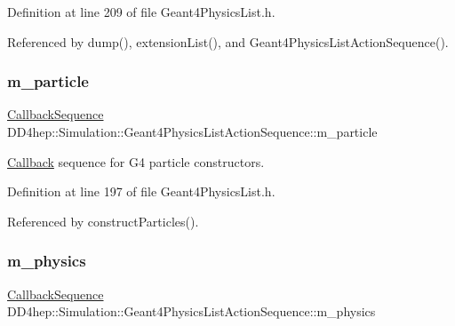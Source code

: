 Definition at line 209 of file Geant4\+Physics\+List.\+h.



Referenced by dump(), extension\+List(), and Geant4\+Physics\+List\+Action\+Sequence().

\hypertarget{class_d_d4hep_1_1_simulation_1_1_geant4_physics_list_action_sequence_ab83212b1da37b0e855097936968be22f}{}\label{class_d_d4hep_1_1_simulation_1_1_geant4_physics_list_action_sequence_ab83212b1da37b0e855097936968be22f} 
\subsubsection{\texorpdfstring{m\+\_\+particle}{m\_particle}}
{\footnotesize\ttfamily \hyperlink{struct_d_d4hep_1_1_callback_sequence}{Callback\+Sequence} D\+D4hep\+::\+Simulation\+::\+Geant4\+Physics\+List\+Action\+Sequence\+::m\+\_\+particle\hspace{0.3cm}{\ttfamily [protected]}}



\hyperlink{class_d_d4hep_1_1_callback}{Callback} sequence for G4 particle constructors. 



Definition at line 197 of file Geant4\+Physics\+List.\+h.



Referenced by construct\+Particles().

\hypertarget{class_d_d4hep_1_1_simulation_1_1_geant4_physics_list_action_sequence_a13902a9fa275fd80e465f51e1e32439f}{}\label{class_d_d4hep_1_1_simulation_1_1_geant4_physics_list_action_sequence_a13902a9fa275fd80e465f51e1e32439f} 
\subsubsection{\texorpdfstring{m\+\_\+physics}{m\_physics}}
{\footnotesize\ttfamily \hyperlink{struct_d_d4hep_1_1_callback_sequence}{Callback\+Sequence} D\+D4hep\+::\+Simulation\+::\+Geant4\+Physics\+List\+Action\+Sequence\+::m\+\_\+physics\hspace{0.3cm}{\ttfamily [protected]}}



